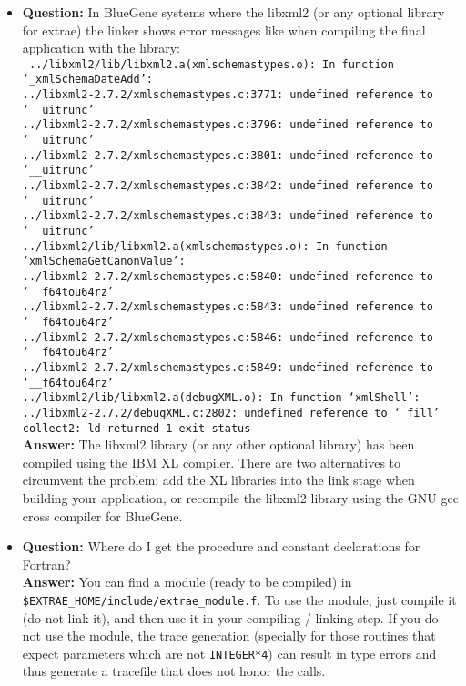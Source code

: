 \begin{itemize}
\item {\bf Question:} In BlueGene systems where the libxml2 (or any optional library for extrae) the linker shows error messages like when compiling the final application with the \TRACE library:\\
			{\tt
			../libxml2/lib/libxml2.a(xmlschemastypes.o): In function `\_xmlSchemaDateAdd':\\
			../libxml2-2.7.2/xmlschemastypes.c:3771: undefined reference to `\_\_uitrunc'\\
			../libxml2-2.7.2/xmlschemastypes.c:3796: undefined reference to `\_\_uitrunc'\\
			../libxml2-2.7.2/xmlschemastypes.c:3801: undefined reference to `\_\_uitrunc'\\
			../libxml2-2.7.2/xmlschemastypes.c:3842: undefined reference to `\_\_uitrunc'\\
			../libxml2-2.7.2/xmlschemastypes.c:3843: undefined reference to `\_\_uitrunc'\\
			../libxml2/lib/libxml2.a(xmlschemastypes.o): In function `xmlSchemaGetCanonValue':\\
			../libxml2-2.7.2/xmlschemastypes.c:5840: undefined reference to `\_\_f64tou64rz'\\
			../libxml2-2.7.2/xmlschemastypes.c:5843: undefined reference to `\_\_f64tou64rz'\\
			../libxml2-2.7.2/xmlschemastypes.c:5846: undefined reference to `\_\_f64tou64rz'\\
			../libxml2-2.7.2/xmlschemastypes.c:5849: undefined reference to `\_\_f64tou64rz'\\
			../libxml2/lib/libxml2.a(debugXML.o): In function `xmlShell':\\
			../libxml2-2.7.2/debugXML.c:2802: undefined reference to `\_fill'\\
			collect2: ld returned 1 exit status\\
			}
			{\bf Answer:  } The libxml2 library (or any other optional library) has been compiled using the IBM XL compiler. There are two alternatives to circumvent the problem: add the XL libraries into the link stage when building your application, or recompile the libxml2 library using the GNU gcc cross compiler for BlueGene.

\item {\bf Question:} Where do I get the procedure and constant declarations for Fortran?\\
      {\bf Answer:  } You can find a module (ready to be compiled) in {\tt \${EXTRAE\_HOME}/include/extrae\_module.f}. To use the module, just compile it (do not link it), and then use it in your compiling / linking step. If you do not use the module, the trace generation (specially for those routines that expect parameters which are not {\tt INTEGER*4}) can result in type errors and thus generate a tracefile that does not honor the \TRACE calls.

\end{itemize}

